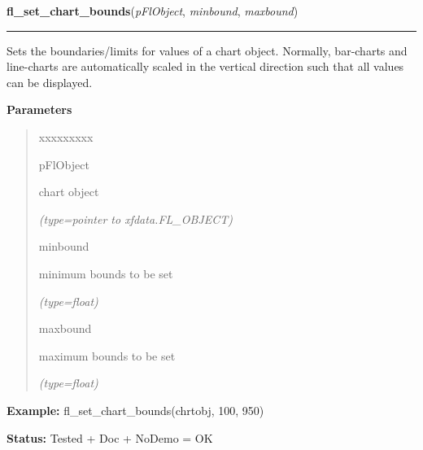     \label{xformslib:flchart:fl_set_chart_bounds}

    \vspace{0.5ex}

\hspace{.8\funcindent}\begin{boxedminipage}{\funcwidth}

    \raggedright \textbf{fl\_set\_chart\_bounds}(\textit{pFlObject}, \textit{minbound}, \textit{maxbound})

    \vspace{-1.5ex}

    \rule{\textwidth}{0.5\fboxrule}
\setlength{\parskip}{2ex}
    Sets the boundaries/limits for values of a chart object. Normally, 
    bar-charts and line-charts are automatically scaled in the vertical 
    direction such that all values can be displayed.

\setlength{\parskip}{1ex}
      \textbf{Parameters}
      \vspace{-1ex}

      \begin{quote}
        \begin{Ventry}{xxxxxxxxx}

          \item[pFlObject]

          chart object

            {\it (type=pointer to xfdata.FL\_OBJECT)}

          \item[minbound]

          minimum bounds to be set

            {\it (type=float)}

          \item[maxbound]

          maximum bounds to be set

            {\it (type=float)}

        \end{Ventry}

      \end{quote}

\textbf{Example:} fl\_set\_chart\_bounds(chrtobj, 100, 950)



\textbf{Status:} Tested + Doc + NoDemo = OK



    \end{boxedminipage}

